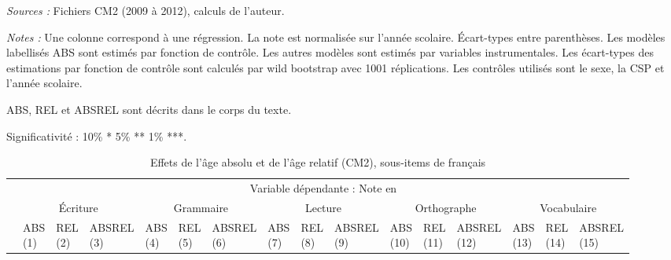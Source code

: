 \documentclass[
]{book}
\begin{document}
\begin{ThreePartTable}
\begin{TableNotes}
\item \textit{Sources :} Fichiers CM2 (2009 à 2012), calculs de l'auteur.
\item \textit{Notes :} Une colonne correspond à une régression. La note est normalisée sur l'année scolaire. Écart-types entre parenthèses. Les modèles labellisés ABS sont estimés par fonction de contrôle. Les autres modèles sont estimés par variables instrumentales. Les écart-types des estimations par fonction de contrôle sont calculés par wild bootstrap avec 1001 réplications. Les contrôles utilisés sont le sexe, la CSP et l'année scolaire.
\item ABS, REL et ABSREL sont décrits dans le corps du texte.
\item Significativité : 10\% * 5\% ** 1\% ***.
\end{TableNotes}
\begin{longtable}[t]{llllllllllllllll}
\caption{\label{tab:agemodelsrelssitemsfrench}Effets de l'âge absolu et de l'âge relatif (CM2), sous-items de français}\\
\toprule
\multicolumn{1}{c}{} & \multicolumn{15}{c}{Variable dépendante : Note en } \\
\cmidrule(l{3pt}r{3pt}){2-16}
\multicolumn{1}{c}{} & \multicolumn{3}{c}{Écriture} & \multicolumn{3}{c}{Grammaire} & \multicolumn{3}{c}{Lecture} & \multicolumn{3}{c}{Orthographe} & \multicolumn{3}{c}{Vocabulaire} \\
\cmidrule(l{3pt}r{3pt}){2-4} \cmidrule(l{3pt}r{3pt}){5-7} \cmidrule(l{3pt}r{3pt}){8-10} \cmidrule(l{3pt}r{3pt}){11-13} \cmidrule(l{3pt}r{3pt}){14-16}
 & \makecell{ABS \\ (1) } & \makecell{REL \\ (2) } & \makecell{ABSREL \\ (3) } & \makecell{ABS \\ (4) } & \makecell{REL \\ (5) } & \makecell{ABSREL \\ (6) } & \makecell{ABS \\ (7) } & \makecell{REL \\ (8) } & \makecell{ABSREL \\ (9) } & \makecell{ABS \\ (10) } & \makecell{REL \\ (11) } & \makecell{ABSREL \\ (12) } & \makecell{ABS \\ (13) } & \makecell{REL \\ (14) } & \makecell{ABSREL \\ (15) }\\

\end{longtable}
\end{ThreePartTable}
\end{document}
